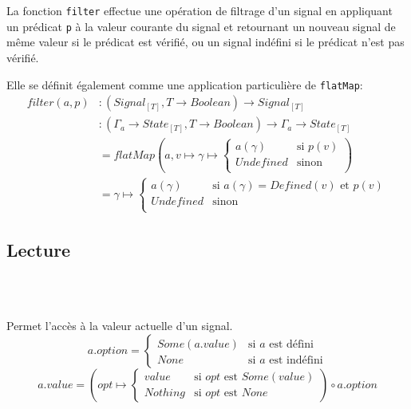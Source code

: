 		La fonction \texttt{filter} effectue une opération de filtrage d'un signal en appliquant un prédicat \texttt{p} à la valeur courante du signal et retournant un nouveau signal de même valeur si le prédicat est vérifié, ou un signal indéfini si le prédicat n'est pas vérifié.
	
		\begin{center}
		\end{center}
		
		Elle se définit également comme une application particulière de \texttt{flatMap}:
		\begin{align*}
			filter(a, p)
				&\colon (Signal_{[T]}, T \to Boolean) \to Signal_{[T]} \\
				&\colon (\Gamma_a \to State_{[T]}, T \to Boolean) \to \Gamma_a \to State_{[T]} \\
				&= flatMap \left( a, v \mapsto \gamma \mapsto \begin{cases}
					a(\gamma) & \text{si } p(v)\\
					Undefined & \text{sinon}\\
				\end{cases} \right)\\
				&= \gamma \mapsto \begin{cases}
					a(\gamma) & \text{si } a(\gamma) = Defined(v) \text{ et } p(v)\\
					Undefined & \text{sinon}\\
				\end{cases}
		\end{align*}
		
	\subsection{Lecture}
	
		\begin{center}
			\\
			\\
		\end{center}
	
		Permet l'accès à la valeur actuelle d'un signal.
		\[
			a.option = \begin{cases}
				Some(a.value) & \text{si } a \text{ est défini}\\
				None & \text{si } a \text{ est indéfini}
			\end{cases}
		\]
		\[
			a.value = \left(opt \mapsto \begin{cases}
				value & \text{si } opt \text{ est } Some(value)\\
				Nothing & \text{si } opt \text{ est } None
			\end{cases}\right) \circ a.option
		\]

